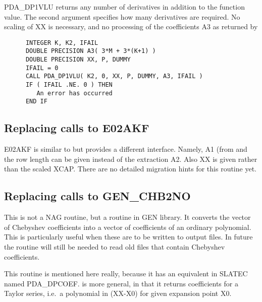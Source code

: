    PDA\_DP1VLU returns any number of derivatives in addition to the function
   value. The second argument specifies how many derivatives are
   required. No scaling of XX is necessary, and no processing of the
   coefficients A3 as returned by

\begin{verbatim}
      INTEGER K, K2, IFAIL
      DOUBLE PRECISION A3( 3*M + 3*(K+1) )
      DOUBLE PRECISION XX, P, DUMMY
      IFAIL = 0
      CALL PDA_DP1VLU( K2, 0, XX, P, DUMMY, A3, IFAIL )
      IF ( IFAIL .NE. 0 ) THEN
         An error has occurred
      END IF
\end{verbatim}


\subsection{Replacing calls to E02AKF}

   E02AKF is similar to
   but provides a different interface.
   Namely, A1 (from
   and the row length can be given instead of the extraction
   A2. Also XX is given rather than the scaled XCAP. There are no
   detailed migration hints for this routine yet.


\subsection{Replacing calls to GEN\_CHB2NO}

   This is not a NAG routine, but a routine in
   GEN library. It converts the vector of Chebyshev coefficients into a
   vector of coefficients of an ordinary polynomial. This is
   particularly useful when these are to be written to output files. In
   future the routine will still be needed to read old files that
   contain Chebyshev coefficients.

   This routine is mentioned here really, because it has an equivalent
   in SLATEC named PDA\_\-DPCOEF.
   is more general, in that it returns
   coefficients for a Taylor series, i.e.\ a polynomial in (XX-X0) for
   given expansion point X0.


